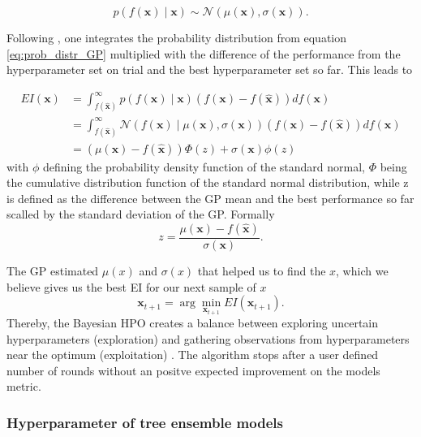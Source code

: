 \documentclass[12pt,a4paper]{article}
\begin{document}
\begin{equation}
p(f(\mathbf{x}) \mid \mathbf{x}) \sim \mathcal{N}(\mu(\mathbf{x}), \sigma(\mathbf{x})).
\label{eq:prob_distr_GP}
\end{equation}

Following \textcite{Brochu2010}, one integrates the probability distribution from equation \ref{eq:prob_distr_GP} multiplied with the difference of the performance from the hyperparameter set on trial and the best hyperparameter set so far. This leads to

\begin{equation}
\begin{aligned}
E I(\mathbf{x}) &=\int_{f(\hat{\mathbf{x}})}^{\infty} p(f(\mathbf{x}) \mid \mathbf{x})(f(\mathbf{x})-f(\hat{\mathbf{x}})) d f(\mathbf{x}) \\
&=\int_{f(\hat{\mathbf{x}})}^{\infty} \mathcal{N}(f(\mathbf{x}) \mid \mu(\mathbf{x}), \sigma(\mathbf{x}))(f(\mathbf{x})-f(\hat{\mathbf{x}})) d f(\mathbf{x}) \\
&= (\mu(\mathbf{x})-f(\hat{\mathbf{x}})) \Phi(z)+\sigma(\mathbf{x}) \phi(z)
\end{aligned}
\end{equation}
with \(\phi\) defining the probability density function of the standard normal, \(\Phi\) being the cumulative distribution function of the standard normal distribution, while z is defined as the difference between the GP mean and the best performance so far scalled by the standard deviation of the GP. Formally
\begin{equation}
z=\frac{\mu(\mathbf{x})-f(\hat{\mathbf{x}})}{\sigma(\mathbf{x})}.
\end{equation}

The GP estimated \(\mu(x)\) and \(\sigma(x)\) that helped us to find the \(x\), which we believe gives us the best EI for our next sample of \(x\)
\begin{equation}
\mathbf{x}_{t+1}=\arg \underset{\mathbf{x}_{t+1}}{\min } E I\left(\mathbf{x}_{t+1}\right).
\end{equation}
Thereby, the Bayesian HPO creates a balance between exploring uncertain hyperparameters (exploration) and gathering observations from hyperparameters near the optimum (exploitation) \textcite{Snoek2012}.
The algorithm stops after a user defined number of rounds without an positve expected improvement on the models metric.

\hypertarget{hyperparameter-of-tree-ensemble-models}{%
\subsubsection{Hyperparameter of tree ensemble models}\label{hyperparameter-of-tree-ensemble-models}}
\end{document}
